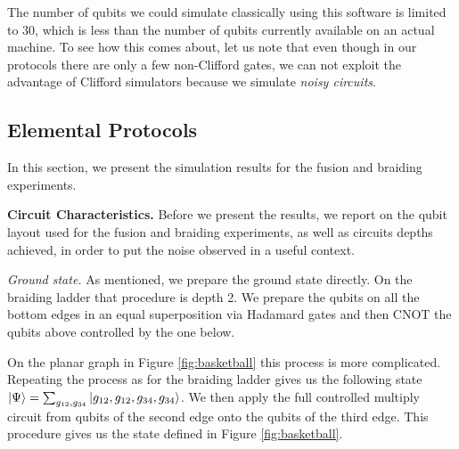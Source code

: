 \documentclass[two column]{article}
\begin{document}
The number of qubits we could simulate classically using this software is limited to 30, which is less than the number of qubits currently available on an actual machine. To see how this comes about, let us note that even though in our protocols there are only a few non-Clifford gates, we can not exploit the advantage of Clifford simulators because we simulate \emph{noisy circuits}. 

\subsection{Elemental Protocols}\label{sec:num:elem}

In this section, we present the simulation results for the fusion and braiding experiments.




\textbf{Circuit Characteristics.} Before we present the results, we report on the qubit layout used for the fusion and braiding experiments, as well as circuits depths achieved, in order to put the noise observed in a useful context.


\emph{Ground state.} As mentioned, we prepare the ground state directly. On the braiding ladder that procedure is depth 2. We prepare the qubits on all the bottom edges in an equal superposition via Hadamard gates and then CNOT the qubits above controlled by the one below. 

On the planar graph in Figure \ref{fig:basketball} this process is more complicated. Repeating the process as for the braiding ladder gives us the following state $\ket{\Psi} = \sum_{g_{12},g_{34}}\ket{g_{12},g_{12}, g_{34}, g_{34}}$. We then apply the full controlled multiply circuit from qubits of the second edge onto the qubits of the third edge. This procedure gives us the state defined in Figure \ref{fig:basketball}.
\end{document}

